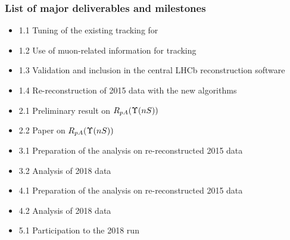 \documentclass[a4paper,11pt]{article}
\begin{document}
\subsubsection*{List of major deliverables and milestones}

\begin{itemize}
 \item 1.1 Tuning of the existing tracking for \pbpb
 \item 1.2 Use of muon-related information for \pbpb tracking
 \item 1.3 Validation and inclusion in the central LHCb reconstruction software
 \item 1.4 Re-reconstruction of 2015 data with the new algorithms
 \item 2.1 Preliminary result on $R_{pA} (\Upsilon(nS))$
 \item 2.2 Paper on $R_{pA} (\Upsilon(nS))$
 \item 3.1 Preparation of the \Dz analysis on re-reconstructed 2015 \pbpb data
 \item 3.2 Analysis of 2018 \pbpb data
 \item 4.1 Preparation of the \Jpsi analysis on re-reconstructed 2015 \pbpb data
 \item 4.2 Analysis of 2018 \pbpb data
 \item 5.1 Participation to the 2018 \pbpb run
\end{itemize}
\end{document}
